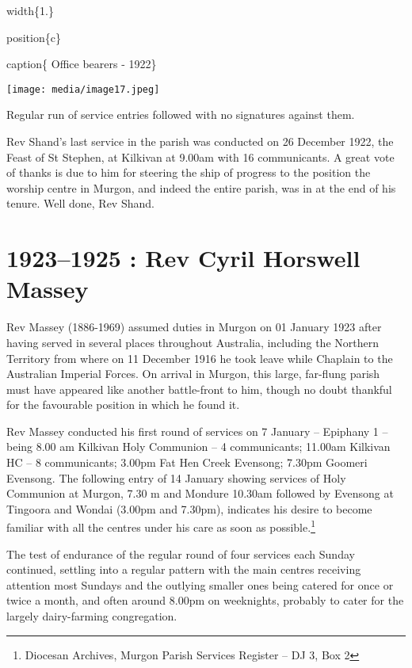 width\{1.\}

position\{c\}

caption\{ Office bearers - 1922\}

\texttt{[image: media/image17.jpeg]}

Regular run of service entries followed with no signatures against them.

Rev Shand's last service in the parish was conducted on 26 December 1922, the Feast of St Stephen, at Kilkivan at 9.00am with 16 communicants. A great vote of thanks is due to him for steering the ship of progress to the position the worship centre in Murgon, and indeed the entire parish, was in at the end of his tenure. Well done, Rev Shand.

\begin{quote}
\end{quote}

\hypertarget{rev-cyril-horswell-massey}{%
\chapter{1923--1925 : Rev Cyril Horswell Massey}\label{rev-cyril-horswell-massey}}

Rev Massey (1886-1969) assumed duties in Murgon on 01 January 1923 after having served in several places throughout Australia, including the Northern Territory from where on 11 December 1916 he took leave while Chaplain to the Australian Imperial Forces. On arrival in Murgon, this large, far-flung parish must have appeared like another battle-front to him, though no doubt thankful for the favourable position in which he found it.

Rev Massey conducted his first round of services on 7 January -- Epiphany 1 -- being 8.00 am Kilkivan Holy Communion -- 4 communicants; 11.00am Kilkivan HC -- 8 communicants; 3.00pm Fat Hen Creek Evensong; 7.30pm Goomeri Evensong. The following entry of 14 January showing services of Holy Communion at Murgon, 7.30 m and Mondure 10.30am followed by Evensong at Tingoora and Wondai (3.00pm and 7.30pm), indicates his desire to become familiar with all the centres under his care as soon as possible.\footnote{Diocesan Archives, Murgon Parish Services Register -- DJ 3, Box 2}

The test of endurance of the regular round of four services each Sunday continued, settling into a regular pattern with the main centres receiving attention most Sundays and the outlying smaller ones being catered for once or twice a month, and often around 8.00pm on weeknights, probably to cater for the largely dairy-farming congregation.


